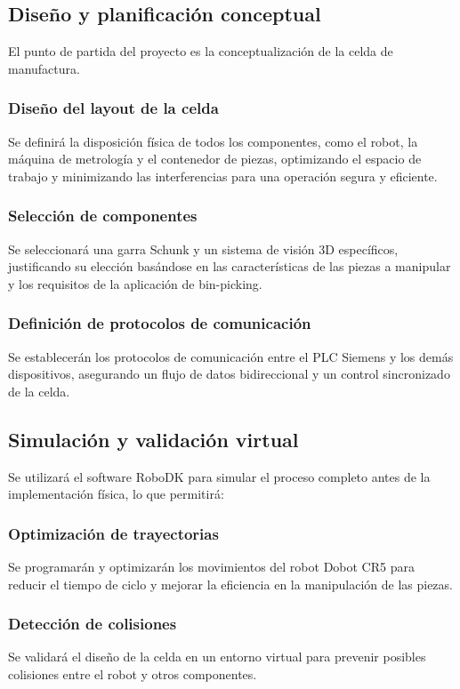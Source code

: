 \documentclass[12pt, a4paper]{article}
\begin{document}
\subsection{Diseño y planificación conceptual}
El punto de partida del proyecto es la conceptualización de la celda de manufactura.

\subsubsection{Diseño del layout de la celda}
Se definirá la disposición física de todos los componentes, como el robot, la máquina de metrología y el contenedor de piezas, optimizando el espacio de trabajo y minimizando las interferencias para una operación segura y eficiente.

\subsubsection{Selección de componentes}
Se seleccionará una garra Schunk y un sistema de visión 3D específicos, justificando su elección basándose en las características de las piezas a manipular y los requisitos de la aplicación de bin-picking.

\subsubsection{Definición de protocolos de comunicación}
Se establecerán los protocolos de comunicación entre el PLC Siemens y los demás dispositivos, asegurando un flujo de datos bidireccional y un control sincronizado de la celda.

\subsection{Simulación y validación virtual}
Se utilizará el software RoboDK para simular el proceso completo antes de la implementación física, lo que permitirá:

\subsubsection{Optimización de trayectorias}
Se programarán y optimizarán los movimientos del robot Dobot CR5 para reducir el tiempo de ciclo y mejorar la eficiencia en la manipulación de las piezas.

\subsubsection{Detección de colisiones}
Se validará el diseño de la celda en un entorno virtual para prevenir posibles colisiones entre el robot y otros componentes.
\end{document}
